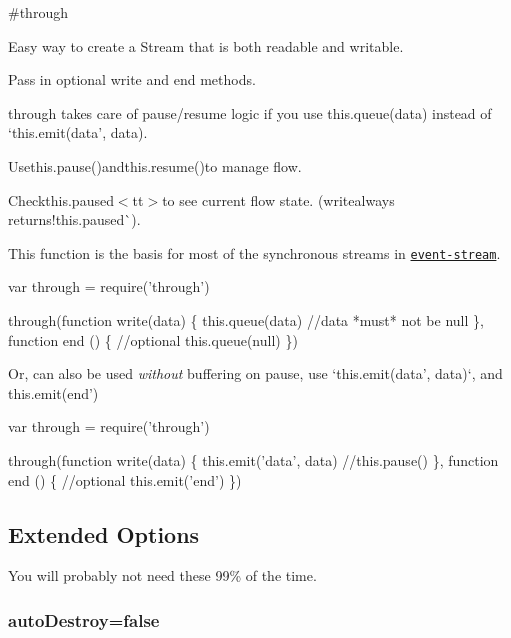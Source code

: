 \#through

\href{http://travis-ci.org/dominictarr/through}{\tt } \href{https://ci.testling.com/dominictarr/through}{\tt }

Easy way to create a {\ttfamily Stream} that is both {\ttfamily readable} and {\ttfamily writable}.


\begin{DoxyItemize}
\item Pass in optional {\ttfamily write} and {\ttfamily end} methods.
\item {\ttfamily through} takes care of pause/resume logic if you use {\ttfamily this.\+queue(data)} instead of `this.\+emit(\textquotesingle{}data', data){\ttfamily .}
\item {\ttfamily Use}this.\+pause(){\ttfamily and}this.\+resume(){\ttfamily to manage flow.}
\item {\ttfamily Check}this.\+paused$<$tt$>$to see current flow state. (write{\ttfamily always returns}!this.paused\`{}).
\end{DoxyItemize}

This function is the basis for most of the synchronous streams in \href{http://github.com/dominictarr/event-stream}{\tt event-\/stream}.


\begin{DoxyCode}
var through = require('through')

through(function write(data) \{
    this.queue(data) //data *must* not be null
  \},
  function end () \{ //optional
    this.queue(null)
  \})
\end{DoxyCode}


Or, can also be used {\itshape without} buffering on pause, use `this.\+emit(\textquotesingle{}data', data)`, and this.\+emit(\textquotesingle{}end')


\begin{DoxyCode}
var through = require('through')

through(function write(data) \{
    this.emit('data', data)
    //this.pause() 
  \},
  function end () \{ //optional
    this.emit('end')
  \})
\end{DoxyCode}


\subsection*{Extended Options}

You will probably not need these 99\% of the time.

\subsubsection*{auto\+Destroy=false}

